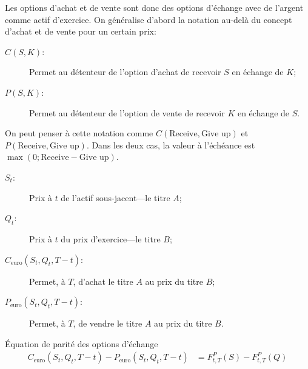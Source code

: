\documentclass[10pt, french]{article}
\begin{document}
\begin{multicols*}{2}
Les options d'achat et de vente sont donc des options d'échange avec de l'argent comme actif d'exercice. On généralise d'abord la notation au-delà du concept d'achat et de vente pour un certain prix:
\begin{rappel_enhanced}[Notation]
\begin{description}
	\item[$C(S, K)$:] Permet au détenteur de l'option d'achat de recevoir $S$ en échange de $K$;
	\item[$P(S, K)$:] Permet au détenteur de l'option de vente de recevoir $K$ en échange de $S$.
\end{description}
\end{rappel_enhanced}

On peut penser à cette notation comme $C(\text{Receive}, \text{Give up})$ et $P(\text{Receive}, \text{Give up})$. Dans les deux cas, la valeur à l'échéance est $\max(0; \text{Receive} - \text{Give up})$.

\begin{rappel_enhanced}
\begin{description}
	\item[$S_{t}$:] Prix à $t$ de l'actif sous-jacent---le titre $A$;
	\item[$Q_{t}$:] Prix à $t$ du prix d'exercice---le titre $B$;
	\item[$C_{\text{euro}}(S_{t}, Q_{t}, T - t)$:] Permet, à $T$, d'achat le titre $A$ au prix du titre $B$;
	\item[$P_{\text{euro}}(S_{t}, Q_{t}, T - t)$:] Permet, à $T$, de vendre le titre $A$ au prix du titre $B$.
\end{description}
\end{rappel_enhanced}

\begin{rappel}{Équation de parité des options d'échange}
\begin{align*}
	C_{\text{euro}}(S_t, Q_t, T - t) - P_{\text{euro}}(S_t, Q_t, T-t) 
	&= 	F_{t,T}^{P}(S) - F_{t,T}^{P}(Q)
\end{align*}
\end{rappel}



\end{multicols*}
\end{document}

